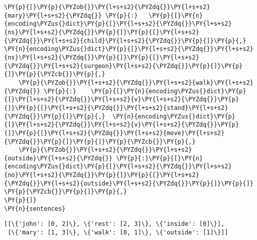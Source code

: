 \begin{tcolorbox}[breakable, size=fbox, boxrule=1pt, pad at break*=1mm,colback=cellbackground, colframe=cellborder]
\begin{Verbatim}[commandchars=\\\{\}]
    \PY{p}{[}\PY{p}{\PYZob{}}\PY{l+s+s2}{\PYZdq{}}\PY{l+s+s2}{mary}\PY{l+s+s2}{\PYZdq{}} \PY{p}{:}   \PY{p}{[}\PY{n}{encoding\PYZus{}dict}\PY{p}{[}\PY{l+s+s2}{\PYZdq{}}\PY{l+s+s2}{ns}\PY{l+s+s2}{\PYZdq{}}\PY{p}{]}\PY{p}{[}\PY{l+s+s2}{\PYZdq{}}\PY{l+s+s2}{child}\PY{l+s+s2}{\PYZdq{}}\PY{p}{]}\PY{p}{,} \PY{n}{encoding\PYZus{}dict}\PY{p}{[}\PY{l+s+s2}{\PYZdq{}}\PY{l+s+s2}{ns}\PY{l+s+s2}{\PYZdq{}}\PY{p}{]}\PY{p}{[}\PY{l+s+s2}{\PYZdq{}}\PY{l+s+s2}{surgeon}\PY{l+s+s2}{\PYZdq{}}\PY{p}{]}\PY{p}{]}\PY{p}{\PYZcb{}}\PY{p}{,}
    \PY{p}{\PYZob{}}\PY{l+s+s2}{\PYZdq{}}\PY{l+s+s2}{walk}\PY{l+s+s2}{\PYZdq{}} \PY{p}{:}    \PY{p}{[}\PY{n}{encoding\PYZus{}dict}\PY{p}{[}\PY{l+s+s2}{\PYZdq{}}\PY{l+s+s2}{v}\PY{l+s+s2}{\PYZdq{}}\PY{p}{]}\PY{p}{[}\PY{l+s+s2}{\PYZdq{}}\PY{l+s+s2}{stand}\PY{l+s+s2}{\PYZdq{}}\PY{p}{]}\PY{p}{,}  \PY{n}{encoding\PYZus{}dict}\PY{p}{[}\PY{l+s+s2}{\PYZdq{}}\PY{l+s+s2}{v}\PY{l+s+s2}{\PYZdq{}}\PY{p}{]}\PY{p}{[}\PY{l+s+s2}{\PYZdq{}}\PY{l+s+s2}{move}\PY{l+s+s2}{\PYZdq{}}\PY{p}{]}\PY{p}{]}\PY{p}{\PYZcb{}}\PY{p}{,}
    \PY{p}{\PYZob{}}\PY{l+s+s2}{\PYZdq{}}\PY{l+s+s2}{outside}\PY{l+s+s2}{\PYZdq{}} \PY{p}{:}\PY{p}{[}\PY{n}{encoding\PYZus{}dict}\PY{p}{[}\PY{l+s+s2}{\PYZdq{}}\PY{l+s+s2}{no}\PY{l+s+s2}{\PYZdq{}}\PY{p}{]}\PY{p}{[}\PY{l+s+s2}{\PYZdq{}}\PY{l+s+s2}{outside}\PY{l+s+s2}{\PYZdq{}}\PY{p}{]}\PY{p}{]} \PY{p}{\PYZcb{}}\PY{p}{]}\PY{p}{,}
\PY{p}{]}
\PY{n}{sentences}
\end{Verbatim}
\end{tcolorbox}

            \begin{tcolorbox}[breakable, boxrule=.5pt, size=fbox, pad at break*=1mm, opacityfill=0]
\begin{Verbatim}[commandchars=\\\{\}]
[[\{'john': [0, 2]\}, \{'rest': [2, 3]\}, \{'inside': [0]\}],
 [\{'mary': [1, 3]\}, \{'walk': [0, 1]\}, \{'outside': [1]\}]]
\end{Verbatim}
\end{tcolorbox}
        
